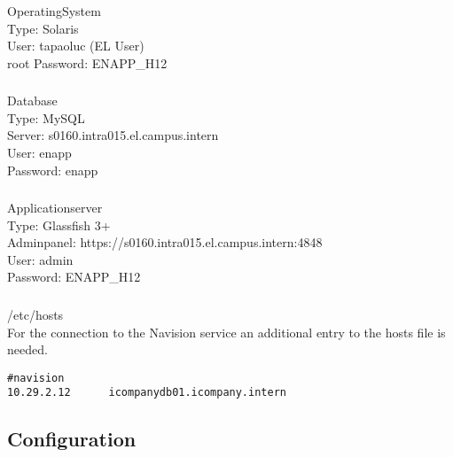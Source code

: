 \documentclass[11pt]{amsart}
\begin{document}
\subsubsection{}OperatingSystem \\
Type: Solaris \\
User: tapaoluc (EL User) \\
root Password: ENAPP\_H12
%
\subsubsection{}Database \\
Type: MySQL \\
Server: s0160.intra015.el.campus.intern \\
User: enapp \\
Password: enapp 
%
\subsubsection{}Applicationserver \\
Type: Glassfish 3+ \\
Adminpanel: https://s0160.intra015.el.campus.intern:4848 \\
User: admin \\
Password: ENAPP\_H12 \\
%
\subsubsection{}/etc/hosts \\
For the connection to the Navision service an additional entry to the hosts file is needed.\
\begin{verbatim}
#navision
10.29.2.12      icompanydb01.icompany.intern
\end{verbatim}
%
\subsection{Configuration}
\end{document}

